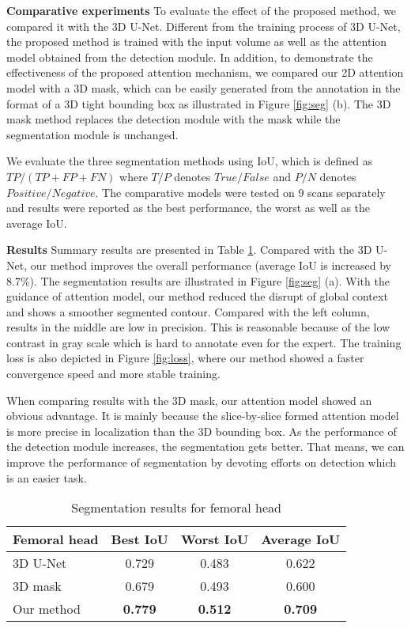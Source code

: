 \noindent
{\bf Comparative experiments}
To evaluate the effect of the proposed method, we compared it with the 3D U-Net. 
Different from the training process of 3D U-Net, the proposed method is trained with the input volume as well as the attention model obtained from the detection module. 
In addition, to demonstrate the effectiveness of the proposed attention mechanism, we compared our 2D attention model with a 3D mask, which can be easily generated from the annotation in the format of a 3D tight bounding box as illustrated in Figure \ref{fig:seg} (b). The 3D mask method replaces the detection module with the mask while the segmentation module is unchanged. 

We evaluate the three segmentation methods using IoU, which is defined as $TP/(TP + FP + FN)$ where $T/P$ denotes $True/False$ and $P/N$ denotes $Positive/Negative$. The comparative models were tested on 9 scans separately and results were reported as the best performance, the worst as well as the average IoU. 

\noindent
{\bf Results} 
Summary results are presented in Table \ref{tb:unet}.
Compared with the 3D U-Net, our method improves the overall performance (average IoU is increased by 8.7\%). The segmentation results are illustrated in Figure \ref{fig:seg} (a). With the guidance of attention model, our method reduced the disrupt of global context and shows a smoother segmented contour. Compared with the left column, results in the middle are low in precision. This is reasonable because of the low contrast in gray scale which is hard to annotate even for the expert. The training loss is also depicted in Figure \ref{fig:loss}, where our method showed a faster convergence speed and more stable training.

When comparing results with the 3D mask, our attention model showed an obvious advantage. It is mainly because the slice-by-slice formed attention model is more precise in localization than the 3D bounding box. As the performance of the detection module increases, the segmentation gets better. That means, we can improve the performance of segmentation by devoting efforts on detection which is an easier task.


\begin{table}[thb]
\centering
\caption{Segmentation results for femoral head}
\begin{tabular}{l|ccc}
\hline
Femoral head & Best IoU & Worst IoU & Average IoU \\ 
\hline
3D U-Net     & 0.729    & 0.483     & 0.622 \\
3D mask & 0.679    & 0.493     & 0.600 \\
Our method   & {\bf 0.779}    & {\bf 0.512}     & {\bf 0.709} \\
\hline
\end{tabular}
\label{tb:unet}
\end{table}



